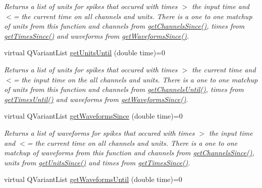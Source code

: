\begin{DoxyCompactItemize}
\begin{DoxyCompactList}\small\item\em Returns a list of units for spikes that occured with times $>$ the input time and $<$= the current time on all channels and units. There is a one to one matchup of units from this function and channels from \hyperlink{class_picto_1_1_spike_reader_a24a5b0c59b6285c35932bb0f06ddb23c}{get\-Channels\-Since()}, times from \hyperlink{class_picto_1_1_spike_reader_a7c4b527d541cd2dd9f5b50aed54a000c}{get\-Times\-Since()} and waveforms from \hyperlink{class_picto_1_1_spike_reader_a881564caff97cd2949847779de89b5ca}{get\-Waveforms\-Since()}. \end{DoxyCompactList}\item 
\hypertarget{class_picto_1_1_spike_reader_a0ac51134841226a5dc2172a5a899eea9}{virtual Q\-Variant\-List \hyperlink{class_picto_1_1_spike_reader_a0ac51134841226a5dc2172a5a899eea9}{get\-Units\-Until} (double time)=0}\label{class_picto_1_1_spike_reader_a0ac51134841226a5dc2172a5a899eea9}

\begin{DoxyCompactList}\small\item\em Returns a list of units for spikes that occured with times $>$ the current time and $<$= the input time on the all channels and units. There is a one to one matchup of units from this function and channels from \hyperlink{class_picto_1_1_spike_reader_aa0b0778b7298d76fa3f2d50911fabbd0}{get\-Channels\-Until()}, times from \hyperlink{class_picto_1_1_spike_reader_a23634600fe4ee36cf5efe834f0c3823b}{get\-Times\-Until()} and waveforms from \hyperlink{class_picto_1_1_spike_reader_a881564caff97cd2949847779de89b5ca}{get\-Waveforms\-Since()}. \end{DoxyCompactList}\item 
\hypertarget{class_picto_1_1_spike_reader_a881564caff97cd2949847779de89b5ca}{virtual Q\-Variant\-List \hyperlink{class_picto_1_1_spike_reader_a881564caff97cd2949847779de89b5ca}{get\-Waveforms\-Since} (double time)=0}\label{class_picto_1_1_spike_reader_a881564caff97cd2949847779de89b5ca}

\begin{DoxyCompactList}\small\item\em Returns a list of waveforms for spikes that occured with times $>$ the input time and $<$= the current time on all channels and units. There is a one to one matchup of waveforms from this function and channels from \hyperlink{class_picto_1_1_spike_reader_a24a5b0c59b6285c35932bb0f06ddb23c}{get\-Channels\-Since()}, units from \hyperlink{class_picto_1_1_spike_reader_ab09fef03ca5abab5b661fc0a2f4c5ed9}{get\-Units\-Since()} and times from \hyperlink{class_picto_1_1_spike_reader_a7c4b527d541cd2dd9f5b50aed54a000c}{get\-Times\-Since()}. \end{DoxyCompactList}\item 
\hypertarget{class_picto_1_1_spike_reader_aac8a425010ec437cde9396ccb9b85ee7}{virtual Q\-Variant\-List \hyperlink{class_picto_1_1_spike_reader_aac8a425010ec437cde9396ccb9b85ee7}{get\-Waveforms\-Until} (double time)=0}\label{class_picto_1_1_spike_reader_aac8a425010ec437cde9396ccb9b85ee7}


\end{DoxyCompactItemize}
